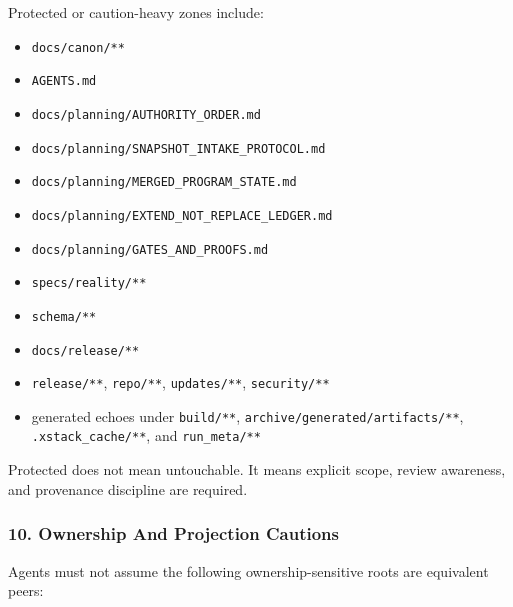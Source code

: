 \documentclass[9pt,a4paper,openany]{book}
\begin{document}
Protected or caution-\allowbreak{}heavy zones include:


\begin{itemize}
\item \texttt{docs/\allowbreak{}canon/\allowbreak{}**}
\item \texttt{AGENTS.\allowbreak{}md}
\item \texttt{docs/\allowbreak{}planning/\allowbreak{}AUTHORITY\_\allowbreak{}ORDER.\allowbreak{}md}
\item \texttt{docs/\allowbreak{}planning/\allowbreak{}SNAPSHOT\_\allowbreak{}INTAKE\_\allowbreak{}PROTOCOL.\allowbreak{}md}
\item \texttt{docs/\allowbreak{}planning/\allowbreak{}MERGED\_\allowbreak{}PROGRAM\_\allowbreak{}STATE.\allowbreak{}md}
\item \texttt{docs/\allowbreak{}planning/\allowbreak{}EXTEND\_\allowbreak{}NOT\_\allowbreak{}REPLACE\_\allowbreak{}LEDGER.\allowbreak{}md}
\item \texttt{docs/\allowbreak{}planning/\allowbreak{}GATES\_\allowbreak{}AND\_\allowbreak{}PROOFS.\allowbreak{}md}
\item \texttt{specs/\allowbreak{}reality/\allowbreak{}**}
\item \texttt{schema/\allowbreak{}**}
\item \texttt{docs/\allowbreak{}release/\allowbreak{}**}
\item \texttt{release/\allowbreak{}**}, \texttt{repo/\allowbreak{}**}, \texttt{updates/\allowbreak{}**}, \texttt{security/\allowbreak{}**}
\item generated echoes under \texttt{build/\allowbreak{}**}, \texttt{archive/\allowbreak{}generated/\allowbreak{}artifacts/\allowbreak{}**}, \texttt{.\allowbreak{}xstack\_\allowbreak{}cache/\allowbreak{}**}, and \texttt{run\_\allowbreak{}meta/\allowbreak{}**}
\end{itemize}

Protected does not mean untouchable.\allowbreak{} It means explicit scope, review awareness, and provenance discipline are required.\allowbreak{}


\subsubsection{10. Ownership And Projection Cautions}

Agents must not assume the following ownership-\allowbreak{}sensitive roots are equivalent peers:
\end{document}
